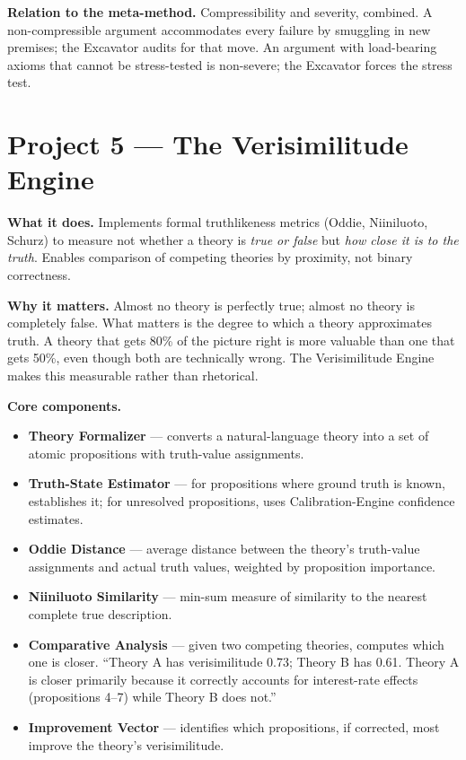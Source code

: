 \documentclass[11pt,letterpaper]{article}
\begin{document}
\textbf{Relation to the meta-method.} Compressibility and severity, combined. A non-compressible argument accommodates every failure by smuggling in new premises; the Excavator audits for that move. An argument with load-bearing axioms that cannot be stress-tested is non-severe; the Excavator forces the stress test.

\section{Project 5 --- The Verisimilitude Engine}

\textbf{What it does.} Implements formal truthlikeness metrics (Oddie, Niiniluoto, Schurz) to measure not whether a theory is \emph{true or false} but \emph{how close it is to the truth}. Enables comparison of competing theories by proximity, not binary correctness.

\textbf{Why it matters.} Almost no theory is perfectly true; almost no theory is completely false. What matters is the degree to which a theory approximates truth. A theory that gets 80\% of the picture right is more valuable than one that gets 50\%, even though both are technically wrong. The Verisimilitude Engine makes this measurable rather than rhetorical.

\textbf{Core components.}

\begin{itemize}[leftmargin=1.5em,itemsep=0.1em]
\item \textbf{Theory Formalizer} --- converts a natural-language theory into a set of atomic propositions with truth-value assignments.
\item \textbf{Truth-State Estimator} --- for propositions where ground truth is known, establishes it; for unresolved propositions, uses Calibration-Engine confidence estimates.
\item \textbf{Oddie Distance} --- average distance between the theory's truth-value assignments and actual truth values, weighted by proposition importance.
\item \textbf{Niiniluoto Similarity} --- min-sum measure of similarity to the nearest complete true description.
\item \textbf{Comparative Analysis} --- given two competing theories, computes which one is closer. ``Theory A has verisimilitude 0.73; Theory B has 0.61. Theory A is closer primarily because it correctly accounts for interest-rate effects (propositions 4--7) while Theory B does not.''
\item \textbf{Improvement Vector} --- identifies which propositions, if corrected, most improve the theory's verisimilitude.
\end{itemize}
\end{document}
